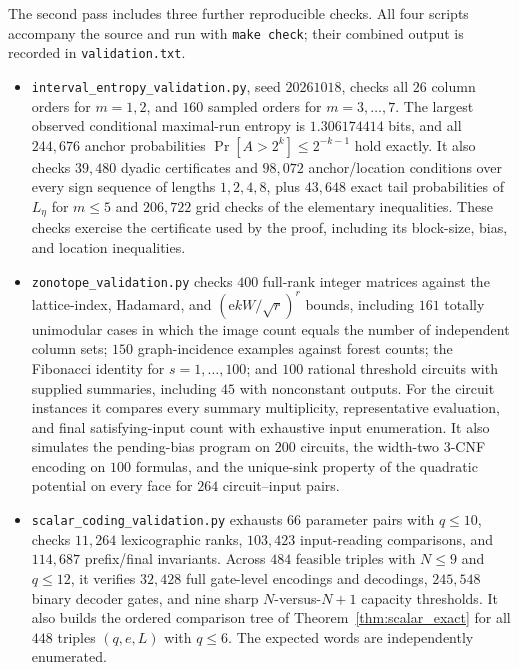 \documentclass[11pt]{article}
\theoremstyle{definition}
\newcommand{\Eul}{\mathrm e}
\begin{document}
The second pass includes three further reproducible checks. All four scripts accompany the source and run with \texttt{make check}; their combined output is recorded in \texttt{validation.txt}.
\begin{itemize}
 \item \texttt{interval\_entropy\_validation.py}, seed \(20261018\), checks all \(26\) column orders for \(m=1,2\), and \(160\) sampled orders for \(m=3,\ldots,7\). The largest observed conditional maximal-run entropy is \(1.306174414\) bits, and all \(244{,}676\) anchor probabilities \(\Pr[A>2^k]\le2^{-k-1}\) hold exactly. It also checks \(39{,}480\) dyadic certificates and \(98{,}072\) anchor/location conditions over every sign sequence of lengths \(1,2,4,8\), plus \(43{,}648\) exact tail probabilities of \(L_\eta\) for \(m\le5\) and \(206{,}722\) grid checks of the elementary inequalities. These checks exercise the certificate used by the proof, including its block-size, bias, and location inequalities.
 \item \texttt{zonotope\_validation.py} checks \(400\) full-rank integer matrices against the lattice-index, Hadamard, and \((\Eul kW/\sqrt r)^r\) bounds, including \(161\) totally unimodular cases in which the image count equals the number of independent column sets; \(150\) graph-incidence examples against forest counts; the Fibonacci identity for \(s=1,\ldots,100\); and \(100\) rational threshold circuits with supplied summaries, including \(45\) with nonconstant outputs. For the circuit instances it compares every summary multiplicity, representative evaluation, and final satisfying-input count with exhaustive input enumeration. It also simulates the pending-bias program on \(200\) circuits, the width-two 3-CNF encoding on \(100\) formulas, and the unique-sink property of the quadratic potential on every face for \(264\) circuit--input pairs.
 \item \texttt{scalar\_coding\_validation.py} exhausts \(66\) parameter pairs with \(q\le10\), checks \(11{,}264\) lexicographic ranks, \(103{,}423\) input-reading comparisons, and \(114{,}687\) prefix/final invariants. Across \(484\) feasible triples with \(N\le9\) and \(q\le12\), it verifies \(32{,}428\) full gate-level encodings and decodings, \(245{,}548\) binary decoder gates, and nine sharp \(N\)-versus-\(N+1\) capacity thresholds. It also builds the ordered comparison tree of Theorem~\ref{thm:scalar_exact} for all \(448\) triples \((q,e,L)\) with \(q\le6\). The expected words are independently enumerated.
\end{itemize}
\end{document}
